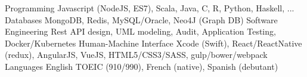 \begin{cvskills}
  \cvskill
    {Programming}
    {Javascript (NodeJS, ES7), Scala, Java, C, R, Python, Haskell, ...}
  \cvskill
    {Databases}
    {MongoDB, Redis, MySQL/Oracle, Neo4J (Graph DB)}
  \cvskill
    {Software Engineering}
    {Rest API design, UML modeling, Audit, Application Testing, Docker/Kubernetes}
  \cvskill
    {Human-Machine Interface}
    {Xcode (Swift), React/ReactNative (redux), AngularJS, VueJS, HTML5/CSS3/SASS, gulp/bower/webpack}
  \cvskill
    {Languages}
    {English TOEIC (910/990), French (native), Spanish (debutant)}
\end{cvskills}
